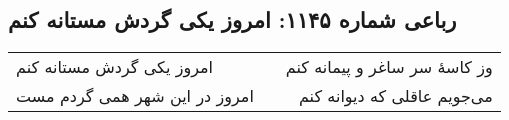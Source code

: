 \begin{center}
\section*{رباعی شماره ۱۱۴۵: امروز یکی گردش مستانه کنم}
\label{sec:1145}
\begin{longtable}{l p{0.5cm} r}
امروز یکی گردش مستانه کنم
&&
وز کاسهٔ سر ساغر و پیمانه کنم
\\
امروز در این شهر همی گردم مست
&&
می‌جویم عاقلی که دیوانه کنم
\\
\end{longtable}
\end{center}
